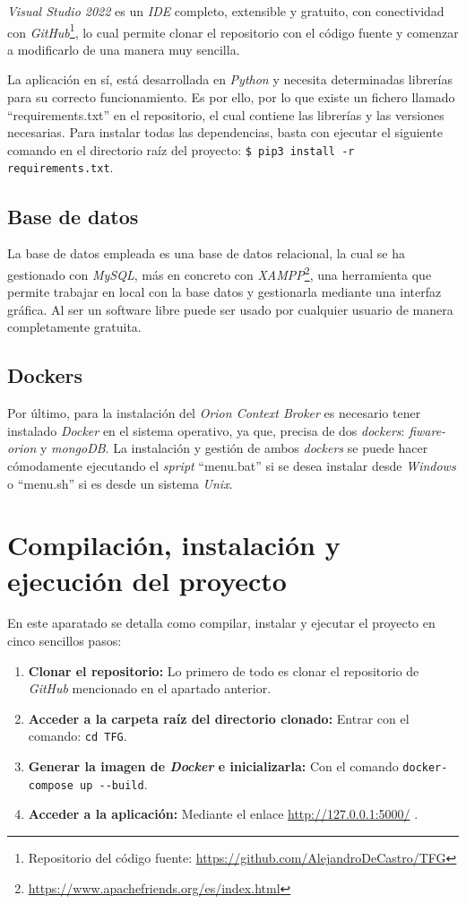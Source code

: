 \textit{Visual Studio 2022} es un \textit{IDE} completo, extensible y gratuito, con conectividad con \textit{GitHub}\footnote{Repositorio del código fuente: \url{https://github.com/AlejandroDeCastro/TFG}}, lo cual permite clonar el repositorio con el código fuente y comenzar a modificarlo de una manera muy sencilla.

La aplicación en sí, está desarrollada en \textit{Python} y necesita determinadas librerías para su correcto funcionamiento. Es por ello, por lo que existe un fichero llamado ``requirements.txt'' en el repositorio, el cual contiene las librerías y las versiones necesarias. Para instalar todas las dependencias, basta con ejecutar el siguiente comando en el directorio raíz del proyecto: \texttt{\$ pip3 install -r requirements.txt}.

\subsection{Base de datos}

La base de datos empleada es una base de datos relacional, la cual se ha gestionado con \textit{MySQL}, más en concreto con \textit{XAMPP}\footnote{\url{https://www.apachefriends.org/es/index.html}}, una herramienta que permite trabajar en local con la base datos y gestionarla mediante una interfaz gráfica. Al ser un software libre puede ser usado por cualquier usuario de manera completamente gratuita.

\subsection{Dockers}

Por último, para la instalación del \textit{Orion Context Broker} es necesario tener instalado \textit{Docker} en el sistema operativo, ya que, precisa de dos \textit{dockers}: \textit{fiware-orion} y \textit{mongoDB}.
La instalación y gestión de ambos \textit{dockers} se puede hacer cómodamente ejecutando el \textit{spript} ``menu.bat'' si se desea instalar desde \textit{Windows} o ``menu.sh'' si es desde un sistema \textit{Unix}.

\section{Compilación, instalación y ejecución del proyecto}

En este aparatado se detalla como compilar, instalar y ejecutar el proyecto en cinco sencillos pasos:
\begin{enumerate}
    \item \textbf{Clonar el repositorio:} Lo primero de todo es clonar el repositorio de \textit{GitHub} mencionado en el apartado anterior.
    \item \textbf{Acceder a la carpeta raíz del directorio clonado:} Entrar con el comando: \texttt{cd TFG}.
    \item \textbf{Generar la imagen de \textit{Docker} e inicializarla:} Con el comando \verb|docker-compose up --build|.
    \item \textbf{Acceder a la aplicación:} Mediante el enlace \url{http://127.0.0.1:5000/} .
\end{enumerate}

